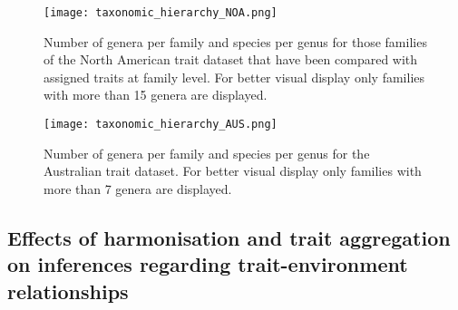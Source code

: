 \documentclass[../Draft_harmonization_paper.tex]{subfiles}
\begin{document}
\begin{figure}[H]
    \centering
    \texttt{[image: taxonomic\_hierarchy\_NOA.png]}
    \caption{Number of genera per family and species per genus for those families of the North American trait dataset that have been compared with assigned traits at family level. For better visual display only families with more than 15 genera are displayed.}
    \label{fig:tax_hierarchy_NOA}
\end{figure}

\begin{figure}[H]
    \centering
    \texttt{[image: taxonomic\_hierarchy\_AUS.png]}
    \caption{Number of genera per family and species per genus for the Australian trait dataset. For better visual display only families with more than 7 genera are displayed.}
    \label{fig:tax_hierarchy_AUS}
\end{figure}


\subsection*{Effects of harmonisation and trait aggregation on inferences regarding trait-environment relationships}
\end{document}
